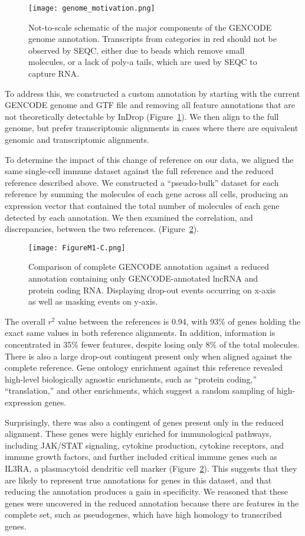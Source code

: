 \begin{figure}
\centering
\texttt{[image: genome\_motivation.png]}
\caption{Not-to-scale schematic of the major components of the GENCODE genome annotation. Transcripts from categories in red should not be observed by SEQC, either due to beads which remove small molecules, or a lack of poly-a tails, which are used by SEQC to capture RNA.}
\label{fig:genome-motivation}
\end{figure}

To address this, we constructed a custom annotation by starting with the current GENCODE genome and GTF file and removing all feature annotations that are not theoretically detectable by InDrop (Figure~\ref{fig:genome-motivation}).
We then align to the full genome, but prefer transcriptomic alignments in cases where there are equivalent genomic and transcriptomic alignments.

To determine the impact of this change of reference on our data, we aligned the same single-cell immune dataset against the full reference and the reduced reference described above. 
We constructed a ``pseudo-bulk'' dataset for each reference by summing the molecules of each gene across all cells, producing an expression vector that contained the total number of molecules of each gene detected by each annotation. 
We then examined the correlation, and discrepancies, between the two references.
(Figure~\ref{fig:m1c}).

\begin{figure}
\centering
\texttt{[image: FigureM1-C.png]}
\caption{Comparison of complete GENCODE annotation against a reduced annotation containing only GENCODE-annotated lncRNA and protein coding RNA\@. Displaying drop-out events occurring on x-axis as well as masking events on y-axis.}
\label{fig:m1c}
\end{figure}

The overall $r^{2}$ value between the references is 0.94, with 93\% of genes holding the exact same values in both reference alignments. 
In addition, information is concentrated in 35\% fewer features, despite losing only 8\% of the total molecules. 
There is also a large drop-out contingent present only when aligned against the complete reference. 
Gene ontology enrichment against this reference revealed high-level biologically agnostic enrichments, such as ``protein coding,'' ``translation,'' and other enrichments, which suggest a random sampling of high-expression genes.

Surprisingly, there was also a contingent of genes present only in the reduced alignment. 
These genes were highly enriched for immunological pathways, including JAK/STAT signaling, cytokine production, cytokine receptors, and immune growth factors, and further included critical immune genes such as IL3RA, a plasmacytoid dendritic cell marker (Figure~\ref{fig:m1c}).  
This suggests that they are likely to represent true annotations for genes in this dataset, and that reducing the annotation produces a gain in specificity. 
We reasoned that these genes were uncovered in the reduced annotation because there are features in the complete set, such as pseudogenes, which have high homology to transcribed genes. 

